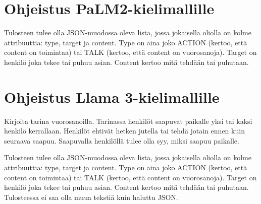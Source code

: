 \chapter{Ohjeistus PaLM2-kielimallille}
\label{ch:palm2-guide}

Tulosteen tulee olla JSON-muodossa oleva lista, jossa jokaisella oliolla on
kolme attribuuttia: type, target ja content. Type on aina joko ACTION (kertoo,
että content on toimintaa) tai TALK (kertoo, että content on vuorosanoja).
Target on henkilö joka tekee tai puhuu asian. Content kertoo mitä tehdään tai
puhutaan.

\chapter{Ohjeistus Llama 3-kielimallille}
\label{ch:llama3-guide}

Kirjoita tarina vuorosanoilla. Tarinassa henkilöt saapuvat paikalle yksi tai
kaksi henkilö kerrallaan. Henkilöt ehtivät hetken jutella tai tehdä jotain
ennen kuin seuraava saapuu. Saapuvalla henkilöllä tulee olla syy, miksi saapuu
paikalle.

Tulosteen tulee olla JSON-muodossa oleva lista, jossa jokaisella oliolla on
kolme attribuuttia: type, target ja content. Type on aina joko ACTION (kertoo,
että content on toimintaa) tai TALK (kertoo, että content on vuorosanoja).
Target on henkilö joka tekee tai puhuu asian. Content kertoo mitä tehdään tai
puhutaan. Tulosteessa ei saa olla muua tekstiä kuin haluttu JSON.
